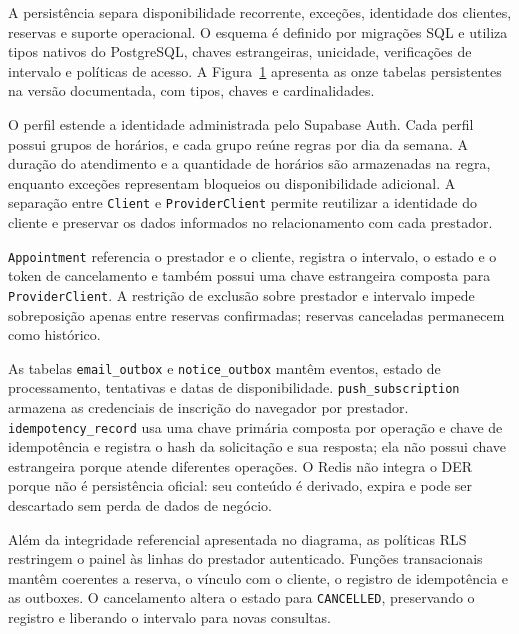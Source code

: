 A persistência separa disponibilidade recorrente, exceções, identidade dos clientes, reservas e suporte operacional. O esquema é definido por migrações SQL e utiliza tipos nativos do PostgreSQL, chaves estrangeiras, unicidade, verificações de intervalo e políticas de acesso. A Figura~\ref{fig:der} apresenta as onze tabelas persistentes na versão documentada, com tipos, chaves e cardinalidades.

O perfil estende a identidade administrada pelo Supabase Auth. Cada perfil possui grupos de horários, e cada grupo reúne regras por dia da semana. A duração do atendimento e a quantidade de horários são armazenadas na regra, enquanto exceções representam bloqueios ou disponibilidade adicional. A separação entre \texttt{Client} e \texttt{ProviderClient} permite reutilizar a identidade do cliente e preservar os dados informados no relacionamento com cada prestador.


\begin{figure}
\thispagestyle{fancy}
\vspace*{-0.6cm}
\noindent\begin{minipage}[t]{\linewidth}
\captionsetup{hypcap=false}
\label{fig:der}
\centering
\resizebox{1\linewidth}{!}{}
\fontepropria
\end{minipage}
\end{figure}

\texttt{Appointment} referencia o prestador e o cliente, registra o intervalo, o estado e o token de cancelamento e também possui uma chave estrangeira composta para \texttt{ProviderClient}. A restrição de exclusão sobre prestador e intervalo impede sobreposição apenas entre reservas confirmadas; reservas canceladas permanecem como histórico.

As tabelas \texttt{email\_outbox} e \texttt{notice\_outbox} mantêm eventos, estado de processamento, tentativas e datas de disponibilidade. \texttt{push\_subscription} armazena as credenciais de inscrição do navegador por prestador. \texttt{idempotency\_record} usa uma chave primária composta por operação e chave de idempotência e registra o hash da solicitação e sua resposta; ela não possui chave estrangeira porque atende diferentes operações. O Redis não integra o DER porque não é persistência oficial: seu conteúdo é derivado, expira e pode ser descartado sem perda de dados de negócio.

Além da integridade referencial apresentada no diagrama, as políticas RLS restringem o painel às linhas do prestador autenticado. Funções transacionais mantêm coerentes a reserva, o vínculo com o cliente, o registro de idempotência e as outboxes. O cancelamento altera o estado para \texttt{CANCELLED}, preservando o registro e liberando o intervalo para novas consultas.

